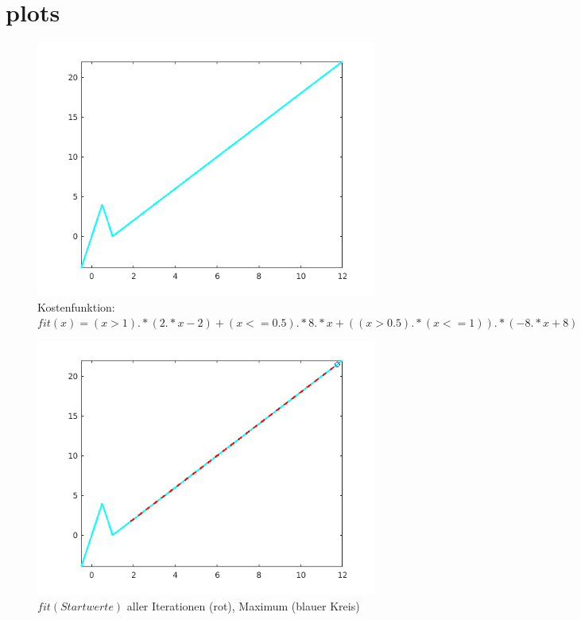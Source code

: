 \documentclass{hbrs-ecta-report}
\begin{document}
\section{plots}

\begin{figure}[ht!]
	\includegraphics[width=\linewidth]{img/fit}
	\caption{Kostenfunktion: $fit(x) = (x>1).*(2.*x-2) + (x<=0.5).*8.*x + ((x>0.5).*(x<=1)).*(-8.*x + 8) $}
	\label{fig:fit}
\end{figure}
\begin{figure}[ht!]
\includegraphics[width=\linewidth]{img/plot_fit_max.png}
\caption{$fit(Startwerte)$ aller Iterationen (rot), Maximum \small(blauer Kreis)}
\label{fig:fit_max} 
\end{figure}
\end{document}
